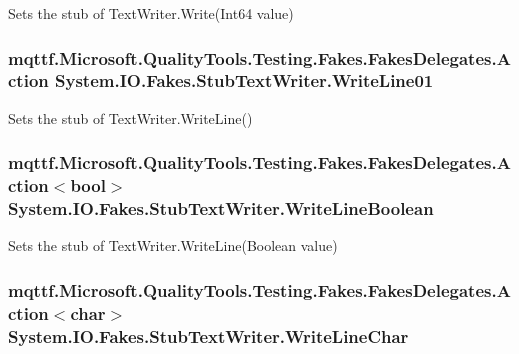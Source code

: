 Sets the stub of Text\-Writer.\-Write(\-Int64 value)

\hypertarget{class_system_1_1_i_o_1_1_fakes_1_1_stub_text_writer_a8cbe521386f25838d7c8438c837948b2}{
\subsubsection[{Write\-Line01}]{\setlength{\rightskip}{0pt plus 5cm}mqttf.\-Microsoft.\-Quality\-Tools.\-Testing.\-Fakes.\-Fakes\-Delegates.\-Action System.\-I\-O.\-Fakes.\-Stub\-Text\-Writer.\-Write\-Line01}}\label{class_system_1_1_i_o_1_1_fakes_1_1_stub_text_writer_a8cbe521386f25838d7c8438c837948b2}


Sets the stub of Text\-Writer.\-Write\-Line()

\hypertarget{class_system_1_1_i_o_1_1_fakes_1_1_stub_text_writer_a95779ca386fcef4c1f22d1720e659fdb}{
\subsubsection[{Write\-Line\-Boolean}]{\setlength{\rightskip}{0pt plus 5cm}mqttf.\-Microsoft.\-Quality\-Tools.\-Testing.\-Fakes.\-Fakes\-Delegates.\-Action$<$bool$>$ System.\-I\-O.\-Fakes.\-Stub\-Text\-Writer.\-Write\-Line\-Boolean}}\label{class_system_1_1_i_o_1_1_fakes_1_1_stub_text_writer_a95779ca386fcef4c1f22d1720e659fdb}


Sets the stub of Text\-Writer.\-Write\-Line(\-Boolean value)

\hypertarget{class_system_1_1_i_o_1_1_fakes_1_1_stub_text_writer_a261c5f2525497bb6d00fa75424be8897}{
\subsubsection[{Write\-Line\-Char}]{\setlength{\rightskip}{0pt plus 5cm}mqttf.\-Microsoft.\-Quality\-Tools.\-Testing.\-Fakes.\-Fakes\-Delegates.\-Action$<$char$>$ System.\-I\-O.\-Fakes.\-Stub\-Text\-Writer.\-Write\-Line\-Char}}\label{class_system_1_1_i_o_1_1_fakes_1_1_stub_text_writer_a261c5f2525497bb6d00fa75424be8897}



